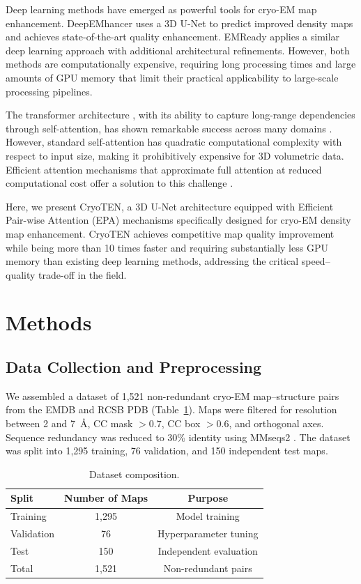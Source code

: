 \documentclass[11pt]{article}
\begin{document}
Deep learning methods have emerged as powerful tools for cryo-EM map enhancement. DeepEMhancer \citep{SanchezGarcia2021} uses a 3D U-Net to predict improved density maps and achieves state-of-the-art quality enhancement. EMReady \citep{He2023} applies a similar deep learning approach with additional architectural refinements. However, both methods are computationally expensive, requiring long processing times and large amounts of GPU memory that limit their practical applicability to large-scale processing pipelines.

The transformer architecture \citep{Vaswani2017}, with its ability to capture long-range dependencies through self-attention, has shown remarkable success across many domains \citep{Dosovitskiy2021,Hatamizadeh2022}. However, standard self-attention has quadratic computational complexity with respect to input size, making it prohibitively expensive for 3D volumetric data. Efficient attention mechanisms that approximate full attention at reduced computational cost offer a solution to this challenge \citep{Wang2020,Shaker2022}.

Here, we present CryoTEN, a 3D U-Net architecture equipped with Efficient Pair-wise Attention (EPA) mechanisms specifically designed for cryo-EM density map enhancement. CryoTEN achieves competitive map quality improvement while being more than 10 times faster and requiring substantially less GPU memory than existing deep learning methods, addressing the critical speed--quality trade-off in the field.

\section{Methods}

\subsection{Data Collection and Preprocessing}

We assembled a dataset of 1,521 non-redundant cryo-EM map--structure pairs from the EMDB and RCSB PDB (Table~\ref{tab:dataset}). Maps were filtered for resolution between 2 and 7~\AA{}, CC mask $> 0.7$, CC box $> 0.6$, and orthogonal axes. Sequence redundancy was reduced to 30\% identity using MMseqs2 \citep{Steinegger2017}. The dataset was split into 1,295 training, 76 validation, and 150 independent test maps.

\begin{table}[H]
\centering
\caption{Dataset composition.}
\label{tab:dataset}
\begin{tabular}{lcc}
\toprule
Split & Number of Maps & Purpose \\
\midrule
Training & 1,295 & Model training \\
Validation & 76 & Hyperparameter tuning \\
Test & 150 & Independent evaluation \\
\midrule
Total & 1,521 & Non-redundant pairs \\
\bottomrule
\end{tabular}
\end{table}
\end{document}
